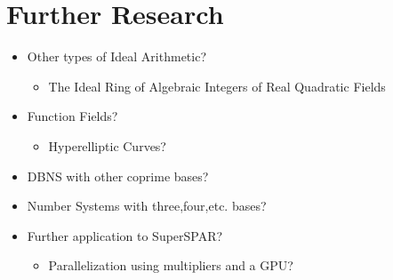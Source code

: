 \documentclass[11pt, letterpaper]{article}
\theoremstyle{definition}
\begin{document}
\section{Further Research}
\begin{itemize}
\item Other types of Ideal Arithmetic?
	\begin{itemize}
	\item The Ideal Ring of Algebraic Integers of Real Quadratic Fields
	\end{itemize}
\item Function Fields?
	\begin{itemize}
	\item Hyperelliptic Curves?
	\end{itemize}
\item DBNS with other coprime bases?
\item Number Systems with three,four,etc. bases?
\item Further application to SuperSPAR?
	\begin{itemize}
	\item Parallelization using multipliers and a GPU?
	\end{itemize}
\end{itemize}
\end{document}
